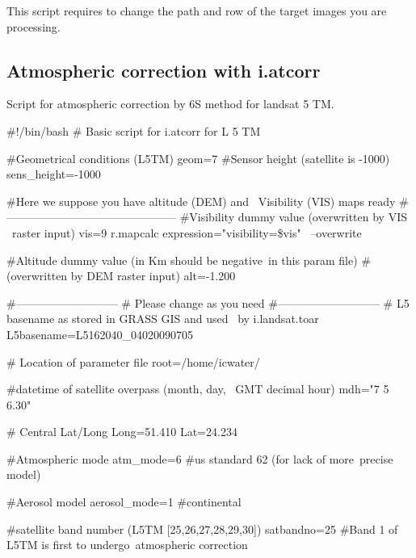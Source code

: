 This script requires to change the path and row of the target images you are processing.\newline

\subsection{Atmospheric correction with i.atcorr}
Script for atmospheric correction by 6S method for landsat 5 TM.\newline

\begin{smallverbatim}
#!/bin/bash
# Basic script for i.atcorr for L 5 TM

#Geometrical conditions (L5TM)
geom=7
#Sensor height (satellite is -1000)
sens_height=-1000

#Here we suppose you have altitude (DEM) and \
 Visibility (VIS) maps ready
#--------------------------------------------- 
#Visibility dummy value (overwritten by VIS \
 raster input)
vis=9
r.mapcalc expression="visibility=\$vis" \
 --overwrite

#Altitude dummy value (in Km should be negative\
 in this param file)
#(overwritten by DEM raster input)
alt=-1.200

#---------------------------
# Please change as you need
#---------------------------
# L5 basename as stored in GRASS GIS and used \
 by i.landsat.toar
L5basename=L5162040\_04020090705

# Location of parameter file
root=/home/icwater/

#datetime of satellite overpass (month, day, \
 GMT decimal hour)
mdh="7 5 6.30"

# Central Lat/Long
Long=51.410
Lat=24.234

#Atmospheric mode
atm\_mode=6 #us standard 62 (for lack of more\
 precise model)

#Aerosol model
aerosol\_mode=1 #continental

#satellite band number (L5TM [25,26,27,28,29,30])
satbandno=25 #Band 1 of L5TM is first to undergo\
 atmospheric correction


\end{smallverbatim}
